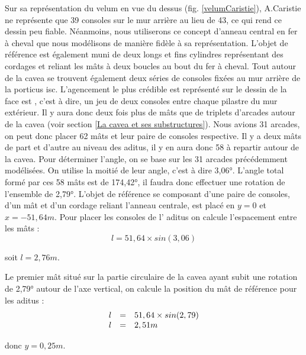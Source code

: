 Sur sa représentation du \gls{velum} en vue du dessus  (fig. \ref{velumCaristie}), A.Caristie ne représente que 39 consoles sur le mur arrière au lieu de 43, ce qui rend ce dessin peu fiable. Néanmoins, nous utiliserons ce concept d'anneau central en fer à cheval que nous modélisons de manière fidèle à sa représentation. L'objet de référence est également muni de deux longs et fins cylindres représentant des cordages et reliant les mâts à deux boucles au bout du fer à cheval.
Tout autour de la \gls{cavea} se trouvent également deux séries de consoles fixées au mur arrière de la \gls{porticus isc}. L'agencement le plus crédible est représenté sur le dessin de la face est \cite[Pl. IV]{orangePl}, c'est à dire, un jeu de deux consoles entre chaque \gls{pilastre} du mur extérieur. Il y aura donc deux fois plus de mâts que de triplets d'arcades autour de la \gls{cavea} (voir section \ref{La cavea et ses substructures}). Nous avions 31 arcades, on peut donc placer 62 mâts et leur paire de consoles respective. Il y a deux mâts de part et d'autre au niveau des \gls{aditus}, il y en aura donc 58 à repartir autour de la \gls{cavea}. Pour déterminer l'angle, on se base sur les 31 arcades précédemment modélisées. On utilise la moitié de leur angle, c'est à dire 3,06°. L'angle total formé par ces 58 mâts est de 174,42°, il faudra donc effectuer une rotation de l'ensemble de 2,79°. L'objet de référence se composant d'une paire de consoles, d'un mât et d'un cordage reliant l'anneau centrale, est placé en $y=0$ et $x=-51,64m$. Pour placer les consoles de l' \gls{aditus} on calcule l'espacement entre les mâts :
\begin{equation}
	l =  51,64 \times sin(3,06) 
\end{equation}
\begin{center}
	soit $l = 2,76m$.
\end{center}

Le premier mât situé sur la partie circulaire de la \gls{cavea} ayant subit une rotation de 2,79° autour de l'axe vertical, on calcule la position du mât de référence pour les  \gls{aditus} :
\begin{equation}
	\begin{array}{r c l}
		l & = & 51,64 \times sin(2,79) \\
		l &= & 2,51m
	\end{array}
\end{equation}
\begin{center}
	donc $y = 0,25m$.
\end{center}

